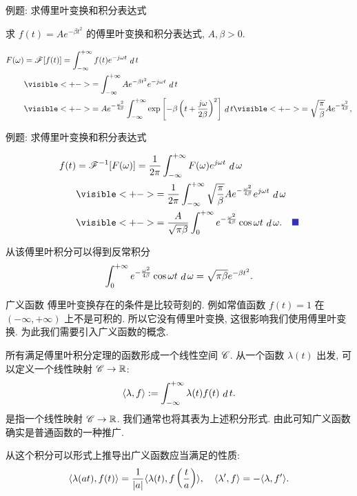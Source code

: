 \begin{frame}{例题: 求傅里叶变换和积分表达式}
\begin{example}
求 $f(t)=Ae^{-\beta t^2}$ 的傅里叶变换和积分表达式, $A,\beta>0$.
\end{example}
\begin{solutions}
\vspace{-\baselineskip}
\begin{align*}
F(\omega)&=\msf[f(t)]=\int_{-\infty}^{+\infty}f(t)e^{-j\omega t}\diff t\\
&\visible<+->{=\int_{-\infty}^{+\infty}Ae^{-\beta t^2}e^{-j\omega t}\diff t}\\
&\visible<+->{=Ae^{-\frac{\omega^2}{4\beta}}\int_{-\infty}^{+\infty}\exp\left[-\beta\left(t+\frac{j\omega}{2\beta}\right)^2\right]\diff t}
\visible<+->{=\sqrt{\frac\pi\beta}Ae^{-\frac{\omega^2}{4\beta}},}
\end{align*}
\end{solutions}
\end{frame}


\begin{frame}{例题: 求傅里叶变换和积分表达式}
\begin{solutionc}
\vspace{-\baselineskip}
\begin{align*}
f(t)&=\msf^{-1}[F(\omega)]=\frac1{2\pi}\int_{-\infty}^{+\infty}F(\omega)e^{j\omega t}\diff\omega\\
&\visible<+->{=\frac1{2\pi}\int_{-\infty}^{+\infty}\sqrt{\frac\pi\beta}Ae^{-\frac{\omega^2}{4\beta}}e^{j\omega t}\diff\omega}\\
&\visible<+->{=\frac  A{\sqrt{\pi\beta}}\int_0^{+\infty}e^{-\frac{\omega^2}{4\beta}}\cos{\omega t}\diff\omega.\mqed}
\end{align*}
\end{solutionc}
\onslide<+->
从该傅里叶积分可以得到反常积分
\[\int_0^{+\infty}e^{-\frac{\omega^2}{4\beta}}\cos{\omega t}\,\mathop{d}\omega=\sqrt{\pi\beta}e^{-\beta t^2}.\]
\end{frame}


\begin{frame}{广义函数}
\onslide<+->
傅里叶变换存在的条件是比较苛刻的.
\onslide<+->
例如常值函数 $f(t)=1$ 在 $(-\infty,+\infty)$ 上不是可积的. 所以它没有傅里叶变换, 这很影响我们使用傅里叶变换.
\onslide<+->
为此我们需要引入广义函数的概念.

\onslide<+->
所有满足傅里叶积分定理的函数形成一个线性空间 $\mathscr{C}$. 
\onslide<+->
从一个函数 $\lambda(t)$ 出发, 可以定义一个线性映射 $\mathscr{C}\to {\mathbb{R}}$:
\[\langle{\lambda,f}\rangle:=\int_{-\infty}^{+\infty}\lambda(t)f(t)\,\mathop{d} t.\]
\onslide<+->
是指一个线性映射 $\mathscr{C}\to {\mathbb{R}}$.
\onslide<+->
我们通常也将其表为上述积分形式.
\onslide<+->
由此可知广义函数确实是普通函数的一种推广.

\onslide<+->
从这个积分可以形式上推导出广义函数应当满足的性质:
\[\langle{\lambda(at),f(t)}\rangle=\dfrac1{|a|}\langle{\lambda(t),f\left(\frac ta\right)}\rangle,\quad
\langle{\lambda',f}\rangle=-\langle{\lambda,f'}\rangle.\]
\end{frame}



